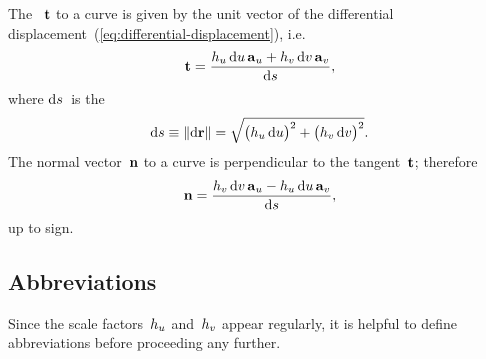 The ~$\mathop{}\!\boldsymbol{\mathrm{t}}$ to a curve
is given by the unit vector of
the differential displacement~(\ref{eq:differential-displacement}),
i.e.\@
\begin{equation}
  \tangentvec =
    \frac{
      \scalefac[u] \td u \basisvec{u}
        +
      \scalefac[v] \td v \basisvec{v}
    }{
      \td s
    },
  \label{eq:tangent-vector}
\end{equation}
where $\mathop{}\!\mathrm{d} s$~is the 
\begin{equation}
  \td s \defeq \norm{\td \positionvec} =
  \sqrt{
    \roundbr[\big]{\scalefac[u] \td u}^2
      +
    \roundbr[\big]{\scalefac[v] \td v}^2
  }.
  \label{eq:differential-arc-length}
\end{equation}
The normal vector~$\mathop{}\!\boldsymbol{\mathrm{n}}$ to a curve
is perpendicular to the tangent~$\mathop{}\!\boldsymbol{\mathrm{t}}$;
therefore
\begin{equation}
  \normalvec =
    \frac{
      \scalefac[v] \td v \basisvec{u}
        -
      \scalefac[u] \td u \basisvec{v}
    }{
      \td s
    },
  \label{eq:normal-vector}
\end{equation}
up to sign.

\subsection{Abbreviations}
\label{sec:curvilinear.calculus.abbreviations}

Since the scale factors~$\scalefac[u]$ and~$\scalefac[v]$ appear regularly,
it is helpful to define abbreviations
before proceeding any further.

